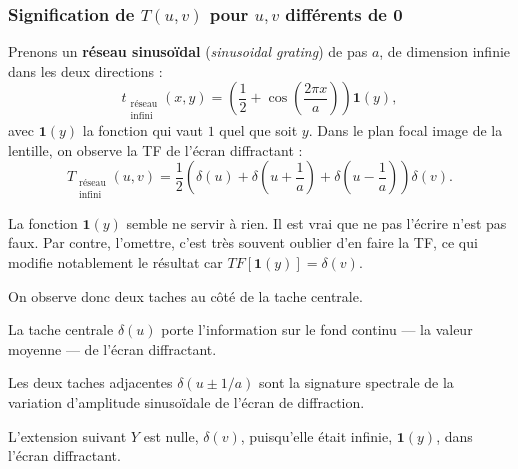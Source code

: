 \subsubsection{Signification de $T(u,v)$ pour $u,v$ différents de 0}
Prenons un \textbf{réseau sinusoïdal} (\textit{sinusoidal grating}) de pas $a$,
de dimension infinie dans les deux directions :
\begin{equation*}
  t_{\substack{\text{réseau}\\ \text{infini}}}(x,y)
    = \left(\frac{1}{2} + \cos\left(\frac{2\pi x}{a}\right)\right)\mathbf{1}(y),
\end{equation*}
avec $\mathbf{1}(y)$ la fonction qui vaut $1$ quel que soit $y$. Dans le plan
focal image de la lentille, on observe la TF de l'écran diffractant :
\begin{equation*}
  T_{\substack{\text{réseau}\\ \text{infini}}}(u,v)
    = \frac{1}{2}\left(\delta(u)
      + \delta\!\left(u + \frac{1}{a}\right)
      + \delta\!\left(u - \frac{1}{a}\right)\right)\delta(v).
\end{equation*}

\begin{remark}
  La fonction $\mathbf{1}(y)$ semble ne servir à rien. Il est vrai que ne pas
  l'écrire n'est pas faux. Par contre, l'omettre, c'est très souvent oublier
  d'en faire la TF, ce qui modifie notablement le résultat car
  $TF[\mathbf{1}(y)] = \delta(v)$.
\end{remark}

On observe donc deux taches au côté de la tache centrale.
\begin{subpart}
  \item La tache centrale $\delta(u)$ porte l'information sur le fond continu
    --- la valeur moyenne --- de l'écran diffractant.
  \item Les deux taches adjacentes $\delta(u \pm 1/a)$ sont la signature
    spectrale de la variation d'amplitude sinusoïdale de l'écran de diffraction.
  \item L'extension suivant $Y$ est nulle, $\delta(v)$, puisqu'elle était
    infinie, $\mathbf{1}(y)$, dans l'écran diffractant.
\end{subpart}

